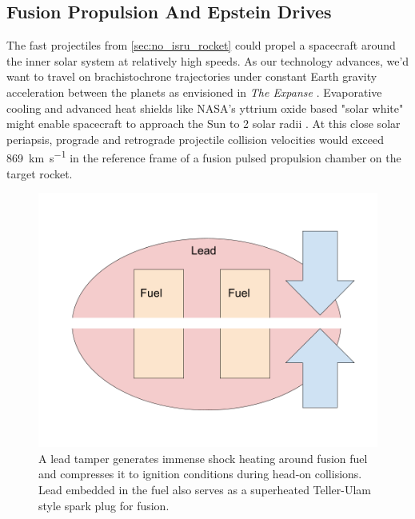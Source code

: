 \documentclass{article}
\begin{document}
\subsection{Fusion Propulsion And Epstein Drives}\label{sec:epstein_drives}
The fast projectiles from \autoref{sec:no_isru_rocket} could propel a spacecraft around the inner solar system at relatively high speeds.   As our technology advances, we'd want to travel on brachistochrone trajectories under constant Earth gravity acceleration between the planets as envisioned in \textit{The Expanse} \cite{Corey2012Drive}.  Evaporative cooling and advanced heat shields like NASA's yttrium oxide based "solar white" might  enable spacecraft to approach the Sun to 2 solar radii \cite{ted_ed_2025_how_close}.  At this close solar periapsis, prograde and retrograde projectile collision velocities would exceed \SI{869}{\kilo\meter\per\second} \cite{Katz_aim_is_all_you_need_2025} in the reference frame of a fusion pulsed propulsion chamber on the target rocket.  

\begin{figure}[htpb]
    \centering
    \includegraphics[width=0.5\linewidth]{images/Fusion Impactors.png}
    \caption{A lead tamper generates immense shock heating around fusion fuel and compresses it to ignition conditions during head-on collisions.  Lead embedded in the fuel also serves as a superheated Teller-Ulam style spark plug \cite{WikipediaThermonuclearWeapon} for fusion.}
    \label{fig:fusion_tamper}
\end{figure}
\end{document}

